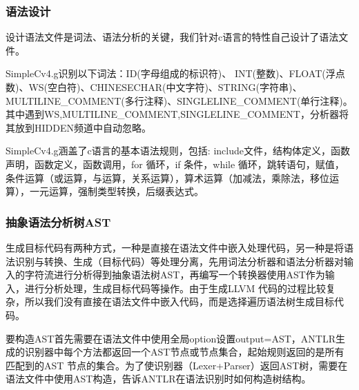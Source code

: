 \documentclass[a4paper]{article}
\begin{document}
\begin{CJK*}{UTF8}{gbsn}
    \subsubsection{语法设计}
    设计语法文件是词法、语法分析的关键，我们针对c语言的特性自己设计了语法文件。
    \par SimpleCv4.g识别以下词法：ID(字母组成的标识符)、 INT(整数)、FLOAT(浮点数)、WS(空白符)、CHINESECHAR(中文字符)、STRING(字符串)、MULTILINE\_COMMENT(多行注释)、SINGLELINE\_COMMENT(单行注释)。其中遇到WS,MULTILINE\_COMMENT,SINGLELINE\_COMMENT，分析器将其放到HIDDEN频道中自动忽略。
    \par SimpleCv4.g涵盖了c语言的基本语法规则，包括: include文件，结构体定义，函数声明，函数定义，函数调用，for 循环，if 条件，while 循环，跳转语句，赋值，条件运算（或运算，与运算，关系运算），算术运算（加减法，乘除法，移位运算），一元运算，强制类型转换，后缀表达式。

    \subsubsection{抽象语法分析树AST}
    生成目标代码有两种方式，一种是直接在语法文件中嵌入处理代码，另一种是将语法识别与转换、生成（目标代码）等处理分离，先用词法分析器和语法分析器对输入的字符流进行分析得到抽象语法树AST，再编写一个转换器使用AST作为输入，进行分析处理，生成目标代码等操作。由于生成LLVM 代码的过程比较复杂，所以我们没有直接在语法文件中嵌入代码，而是选择遍历语法树生成目标代码。
    \par 要构造AST首先需要在语法文件中使用全局option设置output=AST，ANTLR生成的识别器中每个方法都返回一个AST节点或节点集合，起始规则返回的是所有匹配到的AST 节点的集合。为了使识别器（Lexer+Parser）返回AST树，需要在语法文件中使用AST构造，告诉ANTLR在语法识别时如何构造树结构。


\end{CJK*}
\end{document}
